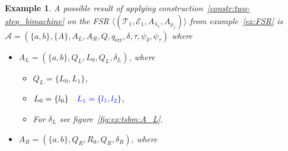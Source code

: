 \documentclass{article}
\newtheorem{example}[definition]{Example}
\begin{document}
	\begin{example} \label{ex:two-step_bimachine}
		A possible result of applying construction~\ref{constr:two-step_bimachine} on the FSR $\langle (\mathcal{T}_1, \mathcal{E}_1, A_{\lambda_1}, A_{\rho_1}) \rangle$ from example~\ref{ex:FSR} is
		$\mathcal{A}=(\{a, b\}, \{A\}, A_L, A_R, Q, q_\mathrm{err}, \delta, \tau, \psi_\delta, \psi_\tau)$ where
		\begin{itemize}
			\item \( A_L = (\{a, b\}, Q_L, L_0, Q_L, \delta_L) \), where %
			\begin{itemize}
				\item \( Q_L = \{ L_0, L_1 \} \),
				\item \(
					\begin{aligned}
						L_0 &= \{l_0\} & \mathcolor{blue}{L_1 &= \{l_1, l_2\}} \\
					\end{aligned}
				\),
\iffalse
				\item \(
					\begin{aligned}
						\delta_L(L_0, a) &= L_1 & \delta_L(L_0, b) &= L_0 & \delta_L(L_1, a) &= L_1 & \delta_L(L_1, b) &= L_0 \\
					\end{aligned}
				\),
\fi
				\item For $\delta_L$ see figure~\ref{fig:ex:tsbm:A_L}.
			\end{itemize}
			\item \( A_R = (\{a, b\}, Q_R, R_0, Q_R, \delta_R) \), where %
\end{itemize}
\end{example}
\end{document}
